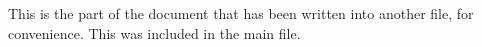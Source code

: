 This is the part of the document that has been written into another file, for convenience. This was included in the main file. 
